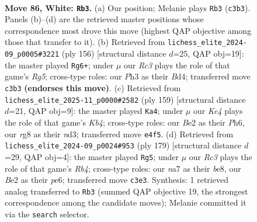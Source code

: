 \documentclass[11pt]{article}
\begin{document}
\clearpage

\begin{figure}[p]\centering
\begin{subfigure}{0.46\textwidth}\centering
\resizebox{\linewidth}{!}{%
\newchessgame
\chessboard[
  setfen={6r1/n7/P2k4/8/4K3/2R3PP/2P1B3/8 w - - 5 86},
  showmover=false,
  pgfstyle=straightmove, color=movearrow, markmove={c3-b3}
]}
\caption{}
\end{subfigure}\hfill
\begin{subfigure}{0.46\textwidth}\centering
\resizebox{\linewidth}{!}{%
\newchessgame
\chessboard[
  setfen={8/8/4k3/6RP/3BK1P1/8/8/7r w - - 1 79},
  showmover=false,
  pgfstyle=straightmove, color=movearrow, markmove={g5-g6}
]}
\caption{}
\end{subfigure}
\\[4pt]
\begin{subfigure}{0.46\textwidth}\centering
\resizebox{\linewidth}{!}{%
\newchessgame
\chessboard[
  setfen={8/8/1p5p/1k6/3K4/3N4/1p5r/5R2 b - - 1 80},
  showmover=false,
  pgfstyle=straightmove, color=movearrow, markmove={b5-a4}
]}
\caption{}
\end{subfigure}\hfill
\begin{subfigure}{0.46\textwidth}\centering
\resizebox{\linewidth}{!}{%
\newchessgame
\chessboard[
  setfen={4B3/R7/1p2Pk2/pr6/3K4/8/8/8 b - - 5 90},
  showmover=false,
  pgfstyle=straightmove, color=movearrow, markmove={b5-g5}
]}
\caption{}
\end{subfigure}
\caption{\textbf{Move 86, White: \texttt{Rb3}.} (a) Our position; Melanie plays \texttt{Rb3} (\texttt{c3b3}). Panels (b)--(d) are the retrieved master positions whose correspondence most drove this move (highest QAP objective among those that transfer to it). (b) Retrieved from \texttt{lichess\_elite\_2024-09\_p0005\#3221} (ply 156) [structural distance $d$=25, QAP obj=19]: the master played \texttt{Rg6+}; under $\mu$ our \emph{Rc3} plays the role of that game's \emph{Rg5}; cross-type roles: our \emph{P}h3 as their \emph{B}d4; transferred move \texttt{c3b3} \textbf{(endorses this move)}. (c) Retrieved from \texttt{lichess\_elite\_2025-11\_p0000\#2582} (ply 159) [structural distance $d$=21, QAP obj=9]: the master played \texttt{Ka4}; under $\mu$ our \emph{Ke4} plays the role of that game's \emph{Kb4}; cross-type roles: our \emph{B}e2 as their \emph{P}h6, our \emph{r}g8 as their \emph{n}d3; transferred move \texttt{e4f5}. (d) Retrieved from \texttt{lichess\_elite\_2024-09\_p0024\#953} (ply 179) [structural distance $d$=29, QAP obj=4]: the master played \texttt{Rg5}; under $\mu$ our \emph{Rc3} plays the role of that game's \emph{Rb4}; cross-type roles: our \emph{n}a7 as their \emph{b}e8, our \emph{B}e2 as their \emph{p}e6; transferred move \texttt{c3e3}. Synthesis: 1 retrieved analog transferred to \texttt{Rb3} (summed QAP objective 19, the strongest correspondence among the candidate moves); Melanie committed it via the \texttt{search} selector.}
\label{fig:thought-m170}
\end{figure}
\end{document}
